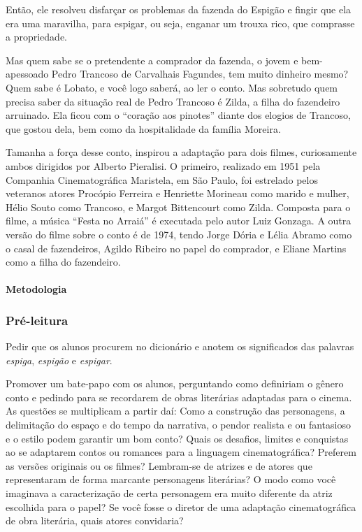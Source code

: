 \documentclass[12pt]{extarticle}
\begin{document}
Então, ele resolveu disfarçar os problemas da fazenda do Espigão e
fingir que ela era uma maravilha, para espigar, ou seja, enganar um
trouxa rico, que comprasse a propriedade.

Mas quem sabe se o pretendente a comprador da fazenda, o jovem e
bem-apessoado Pedro Trancoso de Carvalhais Fagundes, tem muito dinheiro
mesmo? Quem sabe é Lobato, e você logo saberá, ao ler o conto. Mas
sobretudo quem precisa saber da situação real de Pedro Trancoso é Zilda,
a filha do fazendeiro arruinado. Ela ficou com o ``coração aos pinotes''
diante dos elogios de Trancoso, que gostou dela, bem como da
hospitalidade da família Moreira.

Tamanha a força desse conto, inspirou a adaptação para dois filmes,
curiosamente ambos dirigidos por Alberto Pieralisi. O primeiro,
realizado em 1951 pela Companhia Cinematográfica Maristela, em São
Paulo, foi estrelado pelos veteranos atores Procópio Ferreira e
Henriette Morineau como marido e mulher, Hélio Souto como Trancoso, e
Margot Bittencourt como Zilda. Composta para o filme, a música ``Festa
no Arraiá'' é executada pelo autor Luiz Gonzaga. A outra versão do filme
sobre o conto é de 1974, tendo Jorge Dória e Lélia Abramo como o casal
de fazendeiros, Agildo Ribeiro no papel do comprador, e Eliane Martins
como a filha do fazendeiro.

\paragraph{Metodologia}

\subsubsection{Pré-leitura}

Pedir que os alunos procurem no dicionário e anotem os significados das
palavras \emph{espiga}, \emph{espigão} e \emph{espigar}.

Promover um bate-papo com os alunos, perguntando como definiriam o
gênero conto e pedindo para se recordarem de obras literárias adaptadas
para o cinema. As questões se multiplicam a partir daí: Como a
construção das personagens, a delimitação do espaço e do tempo da
narrativa, o pendor realista e ou fantasioso e o estilo podem garantir
um bom conto? Quais os desafios, limites e conquistas ao se adaptarem
contos ou romances para a linguagem cinematográfica? Preferem as versões
originais ou os filmes? Lembram-se de atrizes e de atores que
representaram de forma marcante personagens literárias? O modo como você
imaginava a caracterização de certa personagem era muito diferente da
atriz escolhida para o papel? Se você fosse o diretor de uma adaptação
cinematográfica de obra literária, quais atores convidaria?
\end{document}
